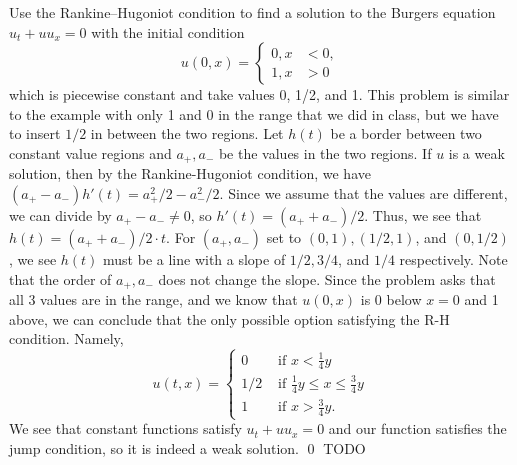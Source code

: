 \documentclass{article}
\begin{document}
\newpage
{} Use the Rankine–Hugoniot condition to find a solution to the Burgers equation
$u_t+ uu_x= 0$ with the initial condition
\[u(0, x) = \begin{cases}
    0, x &< 0,\\
1, x &> 0
\end{cases}\]
which is piecewise constant and take values 0, 1/2, and 1.
\tri
\hop
\solution
This problem is similar to the example with only 1 and 0 in the range that we did in class, but we have to insert $1/2$ in between the two regions.
\hop 
Let $h(t)$ be a border between two constant value regions and $a_+, a_-$ be the values in the two regions. If $u$ is a weak solution, then by the Rankine-Hugoniot condition, we have $(a_+-a_-)h'(t) = a_+^2/2-a_-^2/2$. Since we assume that the values are different, we can divide by $a_+-a_- \ne 0$, so $h'(t) = (a_++a_-)/2$. Thus, we see that $h(t)= (a_++a_-)/2 \cdot t$. For $(a_+,a_-)$ set to $(0,1), (1/2, 1)$, and $(0, 1/2)$, we see $h(t)$ must be a line with a slope of $1/2, 3/4$, and $1/4$ respectively. Note that the order of $a_+,a_-$ does not change the slope. Since the problem asks that all 3 values are in the range, and we know that $u(0,x)$ is 0 below $x=0$ and 1 above, we can conclude that the only possible option satisfying the R-H condition. Namely, 
\[u(t,x)= \begin{cases}
    0 &\text{ if } x <  \frac{1}{4}y \\
    1/2 &\text{ if } \frac{1}{4}y \le x \le  \frac{3}{4}y \\
    1 &\text{ if }x > \frac{3}{4}y.
\end{cases}\]
We see that constant functions satisfy $u_t + uu_x=0$ and our function satisfies the jump condition, so it is indeed a weak solution. \qed
\newpage
{} TODO
\hop
\solution
\end{document}
